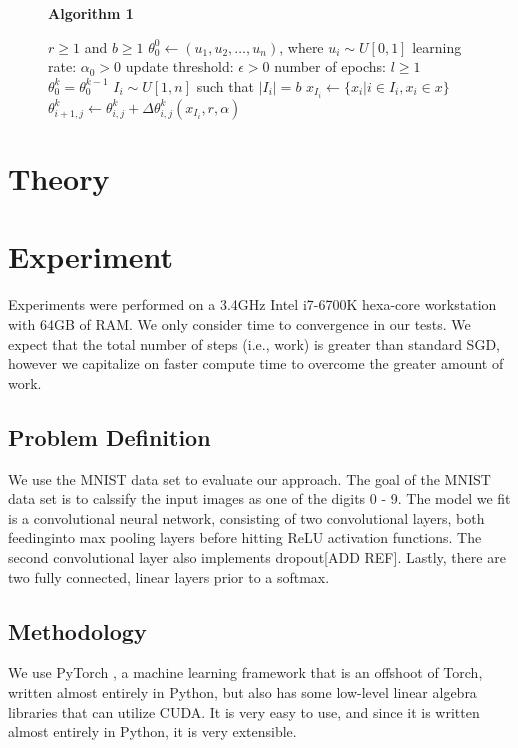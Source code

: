 \documentclass[,conference,compsoc]{IEEEtran}
\begin{document}
\begin{figure}
    \textbf{Algorithm 1}
    \label{fig:algorithm1}
    \begin{algorithmic}[1]
    \REQUIRE $r \geq 1$ and $b \geq 1$ 
    \REQUIRE $\theta_0^0 \gets (u_1, u_2, \dots, u_n)$, where $u_i \sim U[0, 1]$
    \REQUIRE learning rate: $\alpha_0 > 0$
    \REQUIRE update threshold: $\epsilon > 0$
    \REQUIRE number of epochs: $l \geq 1$ 
    \STATE $\theta_0^k = \theta_0^{k-1}$
            \STATE $I_i \sim U[1, n]$ such that  $|I_i| = b$
            \STATE $x_{I_i} \gets \{x_i | i \in I_i, x_i\in x\}$
                \STATE $\theta_{i+1,j}^k \gets \theta_{i,j}^k + \Delta \theta_{i,j}^k(x_{I_i}, r,
                    \alpha)$
            \ENDFOR
        \ENDFOR
    \ENDFOR 
    \end{algorithmic}
\end{figure}

\section{Theory}

\section{Experiment}
Experiments were performed on a 3.4GHz Intel i7-6700K hexa-core workstation with 64GB
of RAM. We only consider time to convergence in our tests. We expect that the
total number of steps (i.e., work) is greater than standard SGD, however we
capitalize on faster compute time to overcome the greater amount of work.

\subsection{Problem Definition}
We use the MNIST data set \cite{bib:mnist} to evaluate our approach. The goal of the
MNIST data set is to calssify the input images as one of the digits 0 - 9. The
model we fit is a convolutional neural network, consisting of two convolutional
layers, both feedinginto max pooling layers before hitting ReLU activation
functions. The second convolutional layer also implements dropout[ADD REF].
Lastly, there are two fully connected, linear layers prior to a softmax. 

\subsection{Methodology}
We use PyTorch \cite{bib:pytorch}, a machine learning framework that is an offshoot of
Torch, written almost entirely in Python, but also has some low-level linear
algebra libraries that can utilize CUDA. It is very easy to use, and since it is
written almost entirely in Python, it is very extensible.
\end{document}
